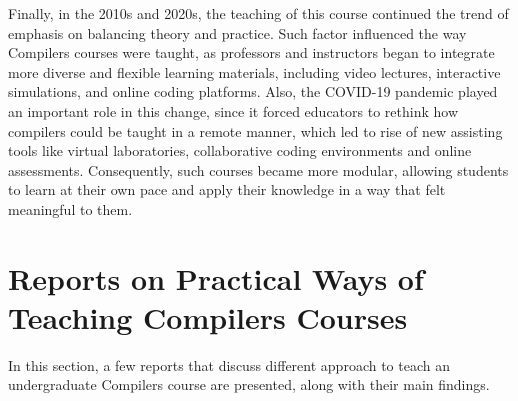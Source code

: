 Finally, in the 2010s and 2020s, the teaching of this course continued the trend of emphasis on balancing theory and practice. Such factor influenced the way Compilers courses were taught, as professors and instructors began to integrate more diverse and flexible learning materials, including video lectures, interactive simulations, and online coding platforms. Also, the COVID-19 pandemic played an important role in this change, since it forced educators to rethink how compilers could be taught in a remote manner, which led to rise of new assisting tools like virtual laboratories, collaborative coding environments and online assessments. Consequently, such courses became more modular, allowing students to learn at their own pace and apply their knowledge in a way that felt meaningful to them.

\section{Reports on Practical Ways of Teaching Compilers Courses}
In this section, a few reports that discuss different approach to teach an undergraduate Compilers course are presented, along with their main findings.

